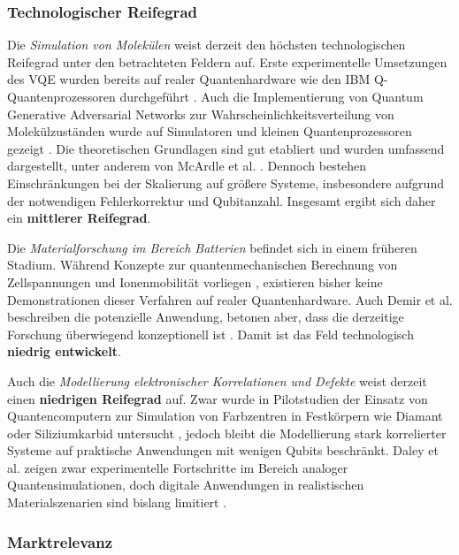 \subsubsection{Technologischer Reifegrad}

Die \textit{Simulation von Molekülen} weist derzeit den höchsten technologischen Reifegrad unter den betrachteten Feldern auf. Erste experimentelle Umsetzungen des VQE wurden bereits auf realer Quantenhardware wie den IBM Q-Quantenprozessoren durchgeführt \cite{kandala2017hardware}. Auch die Implementierung von Quantum Generative Adversarial Networks zur Wahrscheinlichkeitsverteilung von Molekülzuständen wurde auf Simulatoren und kleinen Quantenprozessoren gezeigt \cite{zoufal2019quantum}. Die theoretischen Grundlagen sind gut etabliert und wurden umfassend dargestellt, unter anderem von McArdle et al. \cite{mcardle2020quantum}. Dennoch bestehen Einschränkungen bei der Skalierung auf größere Systeme, insbesondere aufgrund der notwendigen Fehlerkorrektur und Qubitanzahl. Insgesamt ergibt sich daher ein \textbf{mittlerer Reifegrad}.

\vspace{0.5em}

Die \textit{Materialforschung im Bereich Batterien} befindet sich in einem früheren Stadium. Während Konzepte zur quantenmechanischen Berechnung von Zellspannungen und Ionenmobilität vorliegen \cite{urban2016computational}, existieren bisher keine Demonstrationen dieser Verfahren auf realer Quantenhardware. Auch Demir et al. beschreiben die potenzielle Anwendung, betonen aber, dass die derzeitige Forschung überwiegend konzeptionell ist \cite{demir2024application}. Damit ist das Feld technologisch \textbf{niedrig entwickelt}.

\vspace{0.5em}

Auch die \textit{Modellierung elektronischer Korrelationen und Defekte} weist derzeit einen \textbf{niedrigen Reifegrad} auf. Zwar wurde in Pilotstudien der Einsatz von Quantencomputern zur Simulation von Farbzentren in Festkörpern wie Diamant oder Siliziumkarbid untersucht \cite{cao2023ab}, jedoch bleibt die Modellierung stark korrelierter Systeme auf praktische Anwendungen mit wenigen Qubits beschränkt. Daley et al. zeigen zwar experimentelle Fortschritte im Bereich analoger Quantensimulationen, doch digitale Anwendungen in realistischen Materialszenarien sind bislang limitiert \cite{daley2022practical}.


\subsubsection{Marktrelevanz}

